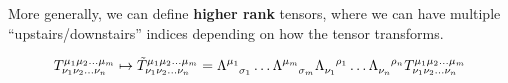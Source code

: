 More generally, we can define \textbf{higher rank} tensors, where we can have multiple ``upstairs/downstairs'' indices depending on how the tensor transforms.

\begin{align*}
  T_{\nu_1 \nu_2 \ldots \nu_n}^{\mu_1 \mu_2 \ldots \mu_m} \mapsto 
  \tilde{T}_{\nu_1 \nu_2 \ldots \nu_n}^{\mu_1 \mu_2 \ldots \mu_m} 
  =
  \tensor{\Lambda}{^{\mu_1}_{\sigma_1}} \ldots \tensor{\Lambda}{^{\mu_m}_{\sigma_m}}
  \tensor{\Lambda}{_{\nu_1}^{\rho_1}}
  \ldots
  \tensor{\Lambda}{_{\nu_n}^{\rho_n}}
  T_{\nu_1 \nu_2 \ldots \nu_n}^{\mu_1 \mu_2 \ldots \mu_m} 
\end{align*}


